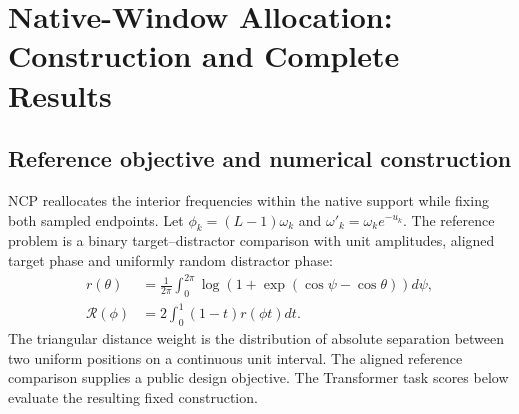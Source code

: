 \section{Native-Window Allocation: Construction and Complete Results}
\label{sec:compact-native}
\subsection{Reference objective and numerical construction}
\label{sec:ncp-construction-new}
NCP reallocates the interior frequencies within the native support while
fixing both sampled endpoints. Let
$\phi_k=(L-1)\omega_k$ and $\omega'_k=\omega_ke^{-u_k}$.
The reference problem is a binary target--distractor comparison with unit
amplitudes, aligned target phase and uniformly random distractor phase:
\begin{align}
r(\theta)&=\frac{1}{2\pi}\int_0^{2\pi}
 \log\!\left(1+\exp(\cos\psi-\cos\theta)\right)d\psi,\\
\mathcal R(\phi)&=2\int_0^1(1-t)r(\phi t)dt.
\label{eq:ncp-reference-risk}
\end{align}
The triangular distance weight is the distribution of absolute separation
between two uniform positions on a continuous unit interval. The aligned
reference comparison supplies a public design objective. The Transformer task
scores below evaluate the resulting fixed construction.


